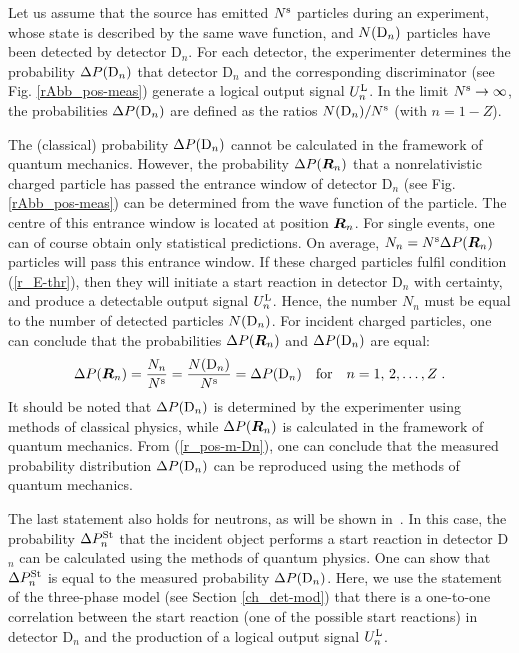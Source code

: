 \documentclass[11pt,a4paper]{article}
\begin{document}
Let us assume that the source has emitted $N^{\rm s}$ particles during an experiment, whose state is described by the same wave function, and 
$N({\rm D}_n)$ particles have been detected by detector D$_n$.  
For each detector, the experimenter determines the probability $\Delta P({\rm D}_n)$ that detector D$_n$ and the corresponding discriminator (see Fig. \ref{rAbb_pos-meas}) generate a logical output signal $U_n^{\rm L}$.  
In the limit $N^{\rm s} \to \infty$, the probabilities $\Delta P({\rm D}_n)$  are defined as the ratios $N({\rm D}_n)/N^{\rm s}$ (with $n = 1 - Z$).  

The (classical) probability $\Delta P({\rm D}_n)$ cannot be calculated in the framework of quantum mechanics.  However, the probability $\Delta P(\mbox{\boldmath$R$}_n)$ that a nonrelativistic charged particle has passed the entrance window of detector D$_n$ (see Fig. \ref{rAbb_pos-meas}) can be determined from the wave function of the particle.  The centre of this entrance window is located at position $\mbox{\boldmath$R$}_n$.  
For single events, one can of course obtain only statistical predictions.  
On average, $N_n = N^{\rm s} \Delta P(\mbox{\boldmath$R$}_n)$ particles will pass this entrance window.   
If these charged particles fulfil condition (\ref{r_E-thr}), then they will initiate a start reaction in detector D$_n$ with certainty, and produce a detectable output signal $U_n^{\rm L}$.  Hence, the number $N_n$ must be equal to the number of detected particles $N({\rm D}_n)$.  
For incident charged particles, one can conclude that the probabilities $\Delta P(\mbox{\boldmath$R$}_n)$ and $\Delta P({\rm D}_n)$ are equal:  
%  
\begin{equation}\label{r_pos-m-Dn}
\Delta P(\mbox{\boldmath$R$}_n) = \frac{N_n}{N^{\rm s}} 
= \frac{N({\rm D}_n)}{N^{\rm s}} = \Delta P({\rm D}_n) 
\quad \mbox{for}  \quad n = 1, \, 2,\dots,Z \;.  
\end{equation}
%
It should be noted that $\Delta P({\rm D}_n)$ is determined by the experimenter using methods of classical physics, while $\Delta P(\mbox{\boldmath$R$}_n)$ is calculated in the framework of quantum mechanics.  From (\ref{r_pos-m-Dn}), one can conclude that the measured probability distribution $\Delta P({\rm D}_n)$ can be reproduced using the methods of quantum mechanics.  

The last statement also holds for neutrons, as will be shown in~\cite{Wick}.  In this case, the probability $\Delta P_n^{\rm St}$ that the incident object performs a start reaction in detector D$_n$ can be calculated using the methods of quantum physics.  
One can show that $\Delta P_n^{\rm St}$ is equal to the measured probability $\Delta P({\rm D}_n)$.  Here, we use the statement of the three-phase model (see Section \ref{ch_det-mod}) that there is a one-to-one correlation between the start reaction (one of the possible start reactions) in detector D$_n$ and the production of a logical output signal $U_n^{\rm L}$.  
\end{document}
